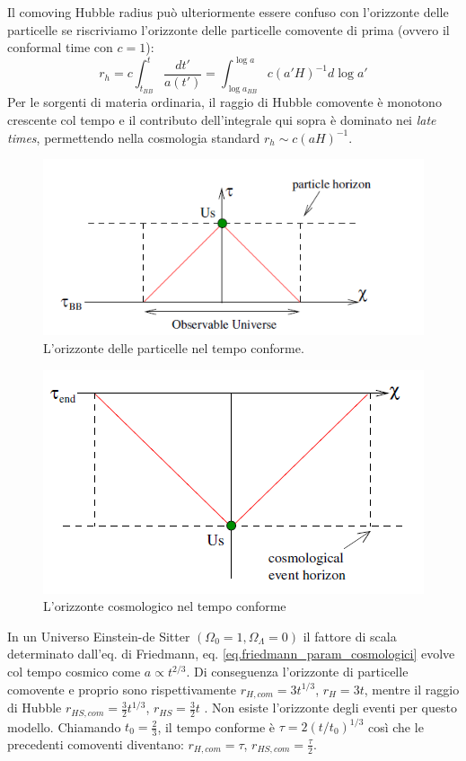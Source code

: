 Il comoving Hubble radius può ulteriormente essere confuso con l'orizzonte delle particelle se riscriviamo l'orizzonte delle particelle comovente di prima (ovvero il conformal time con $c=1$):
\begin{equation*}
    r_h = c \int_{t_{BB}}^t\frac{dt'}{a(t')} = \int_{\log a_{BB}}^{\log a} c(a'H)^{-1}d\log a'
\end{equation*}
Per le sorgenti di materia ordinaria, il raggio di Hubble comovente è monotono crescente col tempo e il contributo dell'integrale qui sopra è dominato nei \textit{late times}, permettendo nella cosmologia standard $r_h \sim c(aH)^{-1}$.
\begin{figure}
    \centering
    \includegraphics[scale=0.8]{immagini/particle_horizon_conforme.png}
    \caption{L'orizzonte delle particelle nel tempo conforme.}
    \label{fig.particle_horizon_conforme}
\end{figure}
\begin{figure}
    \centering
    \includegraphics[scale=0.7]{immagini/orizzonte_cosmologico.png}
    \caption{L'orizzonte cosmologico nel tempo conforme}
    \label{fig.orizzonte_cosmologico_conforme}
\end{figure}
\begin{esempio}
In un Universo Einstein-de Sitter $(\Omega_0 = 1, \Omega_\Lambda =0 )$ il fattore di scala determinato dall'eq. di Friedmann, eq. \ref{eq.friedmann_param_cosmologici} evolve col tempo cosmico come $a \propto t^{2/3}$. Di conseguenza l'orizzonte di particelle comovente e proprio sono rispettivamente $r_{H,com} =3 t^{1/3} $, $r_H = 3t$, mentre il raggio di Hubble $r_{HS, com} = \frac{3}{2}t^{1/3}$, $r_{HS} = \frac{3}{2}t$ . Non esiste l'orizzonte degli eventi per questo modello. Chiamando $t_0 = \frac{2}{3}$, il tempo conforme è $\tau = 2(t/t_0)^{1/3}$ così che le precedenti comoventi diventano: $r_{H,com} = \tau$, $r_{HS, com} = \frac{\tau}{2}$.
\end{esempio}
